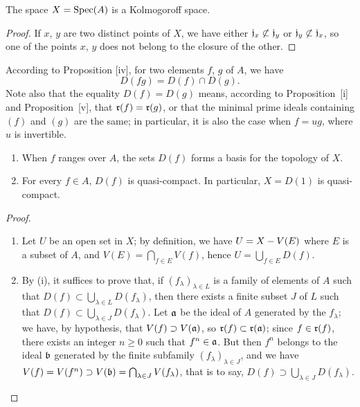 \begin{cor}[1.1.8]
\label{1.1.1.8}
The space $X={\mathop{\mathrm{Spec}}\nolimits}(A)$ is a Kolmogoroff space.
\end{cor}

\begin{proof}
\label{proof-1.1.1.8}
If $x$, $y$ are two distinct points of $X$, we have either $\mathfrak{j}_x\not\subset\mathfrak{j}_y$ or $\mathfrak{j}_y\not\subset\mathfrak{j}_x$, so one of the points $x$, $y$ does not belong to the closure of the other.
\end{proof}

\begin{env}[1.1.9]
\label{1.1.1.9}
According to Proposition [iv], for two elements $f$, $g$ of $A$, we have
\[
  D(fg)=D(f)\cap D(g).
  \tag{1.1.9.1}
\]
Note also that the equality $D(f)=D(g)$ means, according to Proposition~[i] and Proposition~[v], that $\mathfrak{r}(f)=\mathfrak{r}(g)$, or that the minimal prime ideals containing $(f)$ and $(g)$ are the same;
in particular, it is also the case when $f=ug$, where $u$ is invertible.
\end{env}

\begin{prop}[1.1.10]
\label{1.1.1.10}
\medskip\noindent
{}
\begin{enumerate}[label=\emph{(\roman*)}]
  \item When $f$ ranges over $A$, the sets $D(f)$ forms a basis for the topology of $X$.
  \item For every $f\in A$, $D(f)$ is quasi-compact.
    In particular, $X=D(1)$ is quasi-compact.
\end{enumerate}
\end{prop}

\begin{proof}
\label{proof-1.1.1.10}
\medskip\noindent
\begin{enumerate}[label=(\roman*)]
  \item Let $U$ be an open set in $X$;
    by definition, we have $U=X- V(E)$ where $E$ is a subset of $A$, and $V(E)=\bigcap_{f\in E}V(f)$, hence $U=\bigcup_{f\in E}D(f)$.
  \item By (i), it suffices to prove that, if $(f_\lambda)_{\lambda\in L}$ is a family of elements of $A$ such that $D(f)\subset\bigcup_{\lambda\in L}D(f_\lambda)$, then there exists a finite subset $J$ of $L$ such that $D(f)\subset\bigcup_{\lambda\in J}D(f_\lambda)$.
    Let $\mathfrak{a}$ be the ideal of $A$ generated by the $f_\lambda$;
    we have, by hypothesis, that $V(f)\supset V(\mathfrak{a})$, so $\mathfrak{r}(f)\subset\mathfrak{r}(\mathfrak{a})$;
    since $f\in\mathfrak{r}(f)$, there exists an integer $n\geq 0$ such that $f^n\in\mathfrak{a}$.
    But then $f^n$ belongs to the ideal $\mathfrak{b}$ generated by the finite subfamily $(f_\lambda)_{\lambda\in J}$, and we have $V(f)=V(f^n)\supset V(\mathfrak{b})=\bigcap_{\lambda\in J}V(f_\lambda)$, that is to say, $D(f)\supset\bigcup_{\lambda\in J}D(f_\lambda)$.
\end{enumerate}
\end{proof}

